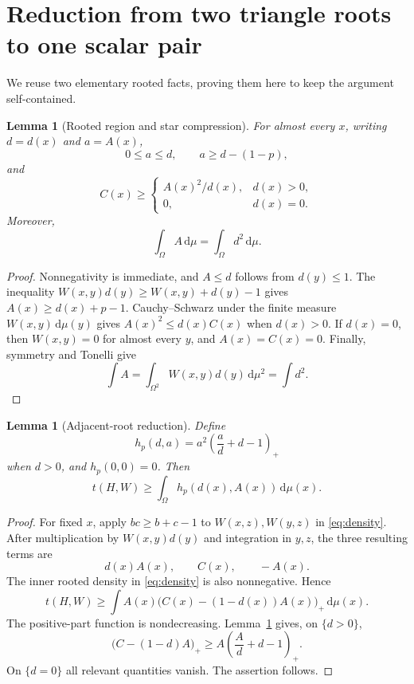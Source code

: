 \documentclass[11pt]{article}
\newtheorem{lemma}[theorem]{Lemma}
\newcommand{\dd}{\,\mathrm d}
\begin{document}
\section{Reduction from two triangle roots to one scalar pair}

We reuse two elementary rooted facts, proving them here to keep the argument
self-contained.

\begin{lemma}[Rooted region and star compression]\label{lem:rooted}
For almost every $x$, writing $d=d(x)$ and $a=A(x)$,
\[
 0\leq a\leq d,
 \qquad a\geq d-(1-p),
\]
and
\[
 C(x)\geq
 \begin{cases}
 A(x)^2/d(x),&d(x)>0,\\
 0,&d(x)=0.
 \end{cases}
\]
Moreover,
\[
 \int_\Omega A\dd\mu=\int_\Omega d^2\dd\mu.
\]
\end{lemma}

\begin{proof}
Nonnegativity is immediate, and $A\leq d$ follows from $d(y)\leq1$.
The inequality $W(x,y)d(y)\geq W(x,y)+d(y)-1$ gives
$A(x)\geq d(x)+p-1$.  Cauchy--Schwarz under the finite measure
$W(x,y)\dd\mu(y)$ gives $A(x)^2\leq d(x)C(x)$ when $d(x)>0$.
If $d(x)=0$, then $W(x,y)=0$ for almost every $y$, and $A(x)=C(x)=0$.
Finally, symmetry and Tonelli give
\[
 \int A=\int_{\Omega^2}W(x,y)d(y)\dd\mu^2=\int d^2.
\]
\end{proof}

\begin{lemma}[Adjacent-root reduction]\label{lem:reduction}
Define
\[
 h_p(d,a)=a^2\left(\frac ad+d-1\right)_+
\]
when $d>0$, and $h_p(0,0)=0$.  Then
\[
 t(H,W)\geq\int_\Omega h_p(d(x),A(x))\dd\mu(x).
\]
\end{lemma}

\begin{proof}
For fixed $x$, apply $bc\geq b+c-1$ to $W(x,z),W(y,z)$ in
\eqref{eq:density}.  After multiplication by $W(x,y)d(y)$ and integration
in $y,z$, the three resulting terms are
\[
 d(x)A(x),\qquad C(x),\qquad -A(x).
\]
The inner rooted density in \eqref{eq:density} is also nonnegative.  Hence
\[
 t(H,W)
 \geq\int A(x)\bigl(C(x)-(1-d(x))A(x)\bigr)_+\dd\mu(x).
\]
The positive-part function is nondecreasing.  Lemma~\ref{lem:rooted} gives,
on $\{d>0\}$,
\[
 \bigl(C-(1-d)A\bigr)_+
 \geq A\left(\frac Ad+d-1\right)_+.
\]
On $\{d=0\}$ all relevant quantities vanish.  The assertion follows.
\end{proof}
\end{document}
